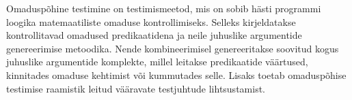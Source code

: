 \documentclass[thesis.tex]{subfiles}
\begin{document}
Omaduspõhine testimine on testimismeetod, mis on sobib hästi programmi loogika matemaatiliste omaduse kontrollimiseks. Selleks kirjeldatakse kontrollitavad omadused predikaatidena ja neile juhuslike argumentide genereerimise metoodika. Nende kombineerimisel genereeritakse soovitud kogus juhuslike argumentide komplekte, millel leitakse predikaatide väärtused, kinnitades omaduse kehtimist või kummutades selle. Lisaks toetab omaduspõhise testimise raamistik leitud vääravate testjuhtude lihtsustamist.

\end{document}
